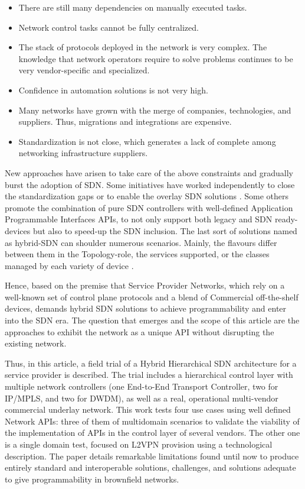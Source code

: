 \documentclass[a4paper,fleqn]{cas-dc}
\begin{document}
\begin{itemize}
    \item There are still many dependencies on manually executed tasks.
    \item Network control tasks cannot be fully centralized.
    \item The stack of protocols deployed in the network is very complex.  The knowledge that network operators require to solve problems continues to be very vendor-specific and specialized.
    \item Confidence in automation solutions is not very high.
    \item Many networks have grown with the merge of companies, technologies, and suppliers. Thus, migrations and integrations are expensive. 
   \item Standardization is not close, which generates a lack of complete among networking infrastructure suppliers.
\end{itemize}

New approaches have arisen to take care of the above constraints and gradually burst the adoption of SDN. Some initiatives have worked independently to close the standardization gaps or to enable the overlay SDN solutions \cite{bemby2015vino}. Some others promote the combination of pure SDN controllers with well-defined Application Programmable Interfaces APIs, to not only support both legacy and SDN ready-devices but also to speed-up the SDN inclusion. The last sort of solutions named as hybrid-SDN can shoulder numerous scenarios. Mainly, the flavours differ between them in the Topology-role, the services supported, or the classes managed by each variety of device \cite{vissicchio2014opportunities}. 

Hence, based on the premise that Service Provider Networks, which rely on a well-known set of control plane protocols and a blend of Commercial off-the-shelf devices, demands hybrid SDN solutions to achieve programmability and enter into the SDN era. The question that emerges and the scope of this article are the approaches to exhibit the network as a unique API without disrupting the existing network. 

Thus, in this article, a field trial of a Hybrid Hierarchical SDN architecture for a service provider is described. The trial includes a hierarchical control layer with multiple network controllers (one End-to-End Transport Controller, two for IP/MPLS, and two for DWDM), as well as a real, operational multi-vendor commercial underlay network. This work tests four use cases using well defined Network APIs: three of them of multidomain scenarios to validate the viability of the implementation of APIs in the control layer of several vendors. The other one is a single domain test, focused on L2VPN provision using a technological description. The paper details remarkable limitations found until now to produce entirely standard and interoperable solutions, challenges, and solutions adequate to give programmability in brownfield networks.
\end{document}
